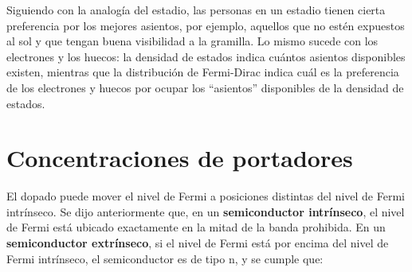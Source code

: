 Siguiendo con la analogía del estadio, las personas en un estadio tienen cierta preferencia por los mejores asientos, por ejemplo, aquellos que no estén expuestos al sol y que tengan buena visibilidad a la gramilla. Lo mismo sucede con los electrones y los huecos: la densidad de estados indica cuántos asientos disponibles existen, mientras que la distribución de Fermi-Dirac indica cuál es la preferencia de los electrones y huecos por ocupar los ``asientos'' disponibles de la densidad de estados.












\section{Concentraciones de portadores}

El dopado puede mover el nivel de Fermi a posiciones distintas del nivel de Fermi intrínseco. Se dijo anteriormente que, en un \textbf{semiconductor intrínseco}, el nivel de Fermi está ubicado exactamente en la mitad de la banda prohibida. En un \textbf{semiconductor extrínseco}, si el nivel de Fermi está por encima del nivel de Fermi intrínseco, el semiconductor es de tipo n, y se cumple que:

